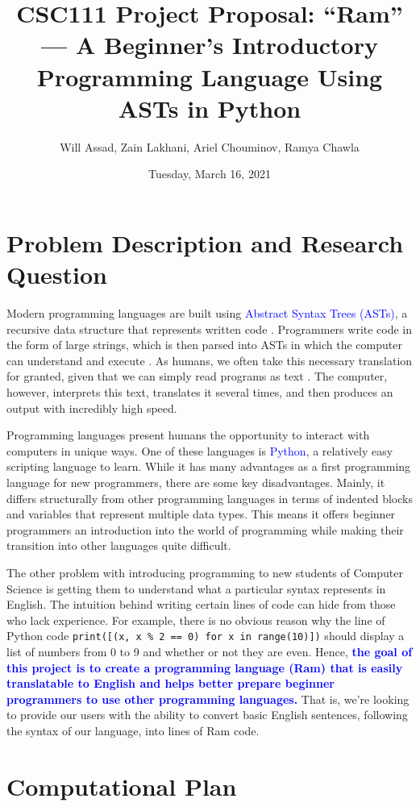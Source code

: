 \documentclass[fontsize=11pt]{article}
\title{CSC111 Project Proposal: ``Ram'' --- A Beginner's Introductory Programming Language Using ASTs in Python}
\author{Will Assad, Zain Lakhani, Ariel Chouminov, Ramya Chawla}
\date{Tuesday, March 16, 2021}
\newcommand{\blue}[1]{\textcolor{blue}{#1}}
\begin{document}
\maketitle

\section*{Problem Description and Research Question}
Modern programming languages are built using \blue{Abstract Syntax Trees (ASTs)}, a recursive data structure that represents written code \cite{david}. Programmers write code in the form of large strings, which is then parsed into ASTs in which the computer can understand and execute \cite{david, ASTs}. As humans, we often take this necessary translation for granted, given that we can simply read programs as text \cite{david}. The computer, however, interprets this text, translates it several times, and then produces an output with incredibly high speed.

Programming languages present humans the opportunity to interact with computers in unique ways. One of these languages is \blue{Python}, a relatively easy scripting language to learn. While it has many advantages as a first programming language for new programmers, there are some key disadvantages. Mainly, it differs structurally from other programming languages in terms of indented blocks and variables that represent multiple data types. This means it offers beginner programmers an introduction into the world of programming while making their transition into other languages quite difficult. 

The other problem with introducing programming to new students of Computer Science is getting them to understand what a particular syntax represents in English. The intuition behind writing certain lines of code can hide from those who lack experience. For example, there is no obvious reason why the line of Python code \texttt{print([(x, x \% 2 == 0) for x in range(10)])} should display a list of numbers from 0 to 9 and whether or not they are even. Hence, \blue{\textbf{the goal of this project is to create a programming language (Ram) that is easily translatable to English and helps better prepare beginner programmers to use other programming languages.}} That is, we're looking to provide our users with the ability to convert basic English sentences, following the syntax of our language, into lines of Ram code.

\section*{Computational Plan}
\end{document}
